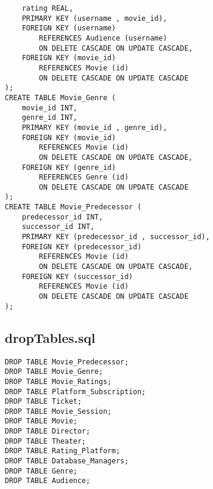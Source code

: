 \documentclass[12pt, A4, titlepage]{article}
\begin{document}
\begin{verbatim}
    rating REAL,
    PRIMARY KEY (username , movie_id),
    FOREIGN KEY (username)
        REFERENCES Audience (username)
        ON DELETE CASCADE ON UPDATE CASCADE,
    FOREIGN KEY (movie_id)
        REFERENCES Movie (id)
        ON DELETE CASCADE ON UPDATE CASCADE
);
CREATE TABLE Movie_Genre (
    movie_id INT,
    genre_id INT,
    PRIMARY KEY (movie_id , genre_id),
    FOREIGN KEY (movie_id)
        REFERENCES Movie (id)
        ON DELETE CASCADE ON UPDATE CASCADE,
    FOREIGN KEY (genre_id)
        REFERENCES Genre (id)
        ON DELETE CASCADE ON UPDATE CASCADE
);
CREATE TABLE Movie_Predecessor (
    predecessor_id INT,
    successor_id INT,
    PRIMARY KEY (predecessor_id , successor_id),
    FOREIGN KEY (predecessor_id)
        REFERENCES Movie (id)
        ON DELETE CASCADE ON UPDATE CASCADE,
    FOREIGN KEY (successor_id)
        REFERENCES Movie (id)
        ON DELETE CASCADE ON UPDATE CASCADE
);
\end{verbatim}

\newpage
\subsection{dropTables.sql}
\begin{verbatim}
DROP TABLE Movie_Predecessor;
DROP TABLE Movie_Genre;
DROP TABLE Movie_Ratings;
DROP TABLE Platform_Subscription;
DROP TABLE Ticket;
DROP TABLE Movie_Session;
DROP TABLE Movie;
DROP TABLE Director;
DROP TABLE Theater;
DROP TABLE Rating_Platform;
DROP TABLE Database_Managers;
DROP TABLE Genre;
DROP TABLE Audience;
\end{verbatim}
\end{document}
